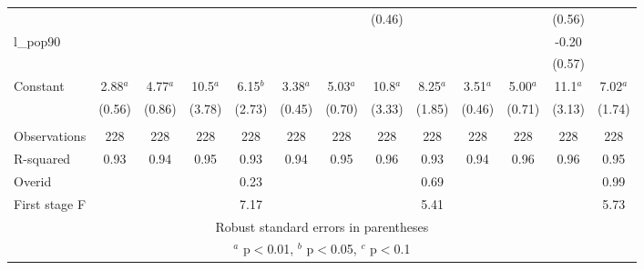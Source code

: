\documentclass[]{article}
\begin{document}
\begin{tabular}{lcccccccccccc}
 &  &  &  &  &  &  & (0.46) &  &  &  & (0.56) &  \\
l\_pop90 &  &  &  &  &  &  &  &  &  &  & -0.20 &  \\
 &  &  &  &  &  &  &  &  &  &  & (0.57) &  \\
Constant & 2.88$^a$ & 4.77$^a$ & 10.5$^a$ & 6.15$^b$ & 3.38$^a$ & 5.03$^a$ & 10.8$^a$ & 8.25$^a$ & 3.51$^a$ & 5.00$^a$ & 11.1$^a$ & 7.02$^a$ \\
 & (0.56) & (0.86) & (3.78) & (2.73) & (0.45) & (0.70) & (3.33) & (1.85) & (0.46) & (0.71) & (3.13) & (1.74) \\
 &  &  &  &  &  &  &  &  &  &  &  &  \\
Observations & 228 & 228 & 228 & 228 & 228 & 228 & 228 & 228 & 228 & 228 & 228 & 228 \\
R-squared & 0.93 & 0.94 & 0.95 & 0.93 & 0.94 & 0.95 & 0.96 & 0.93 & 0.94 & 0.96 & 0.96 & 0.95 \\
Overid &  &  &  & 0.23 &  &  &  & 0.69 &  &  &  & 0.99 \\
 First stage F &  &  &  & 7.17 &  &  &  & 5.41 &  &  &  & 5.73 \\ \hline
\multicolumn{13}{c}{ Robust standard errors in parentheses} \\
\multicolumn{13}{c}{ $^a$ p$<$0.01, $^b$ p$<$0.05, $^c$ p$<$0.1} \\
\end{tabular}
\end{document}
